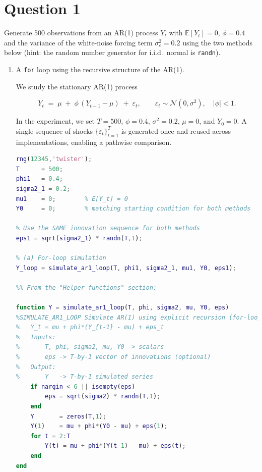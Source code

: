 \documentclass[dvipsnames,11pt]{article}
\begin{document}
\section*{Question 1}
\setcounter{section}{1}

    Generate 500 observations from an AR(1) process $Y_t$ with $\mathbb{E}[Y_t]=0$, $\phi=0.4$ and the variance of the white-noise forcing term $\sigma_\varepsilon^2=0.2$ using the two methods below (hint: the random number generator for i.i.d.\ normal is \texttt{randn}).

    \begin{enumerate}[label=\alph*.]
        \item A \texttt{for} loop using the recursive structure of the AR(1).
        
            \begin{solution}

                We study the stationary AR(1) process
                
                \begin{equation}
                  Y_t \;=\; \mu \;+\; \phi\,(Y_{t-1}-\mu) \;+\; \varepsilon_t,
                  \qquad \varepsilon_t \sim \mathcal{N}(0,\sigma^2),\quad |\phi|<1.
                \end{equation}
                
                In the experiment, we set $T=500$, $\phi=0.4$, $\sigma^2=0.2$, $\mu=0$, and $Y_0=0$.
                A single sequence of shocks $\{\varepsilon_t\}_{t=1}^T$ is generated once and reused across implementations, enabling a pathwise comparison.

\begin{lstlisting}[language=Matlab]
rng(12345,'twister');
T      = 500;
phi1   = 0.4;
sigma2_1 = 0.2;
mu1    = 0;        % E[Y_t] = 0
Y0     = 0;        % matching starting condition for both methods

% Use the SAME innovation sequence for both methods
eps1 = sqrt(sigma2_1) * randn(T,1);

% (a) For-loop simulation
Y_loop = simulate_ar1_loop(T, phi1, sigma2_1, mu1, Y0, eps1);

%% From the "Helper functions" section:

function Y = simulate_ar1_loop(T, phi, sigma2, mu, Y0, eps)
%SIMULATE_AR1_LOOP Simulate AR(1) using explicit recursion (for-loop).
%   Y_t = mu + phi*(Y_{t-1} - mu) + eps_t
%   Inputs:
%       T, phi, sigma2, mu, Y0 -> scalars
%       eps -> T-by-1 vector of innovations (optional)
%   Output:
%       Y   -> T-by-1 simulated series
    if nargin < 6 || isempty(eps)
        eps = sqrt(sigma2) * randn(T,1);
    end
    Y       = zeros(T,1);
    Y(1)    = mu + phi*(Y0 - mu) + eps(1);
    for t = 2:T
        Y(t) = mu + phi*(Y(t-1) - mu) + eps(t);
    end
end
\end{lstlisting}


\end{solution}
\end{enumerate}
\end{document}

